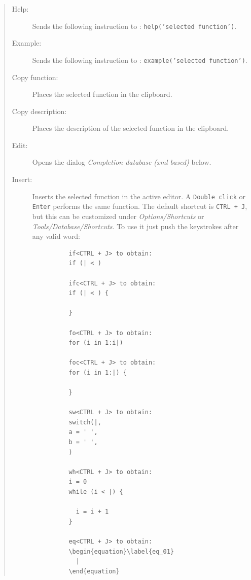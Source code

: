 \begin{quote}
  \begin{footnotesize}
    \begin{description}
      \item[Help:]
        Sends the following instruction to \RR{}: \texttt{help('selected function')}.
      \item[Example:]
        Sends the following instruction to \RR{}:
        \texttt{example('selected function')}.
      \item[Copy function:]
        Places the selected function in the clipboard.
      \item[Copy description:]
        Places the description of the selected function in the clipboard.
      \item[Edit:]
        Opens the dialog \textit{Completion database (xml based)} below.
      \item[Insert:]
        Inserts the selected function in the active editor. A \texttt{Double click}
        or \texttt{Enter} performs the same function.
        The default shortcut is \texttt{CTRL + J}, but this can be customized under
        \textit{Options/Shortcuts} or \textit{Tools/Database/Shortcuts}. To use
        it just push the keystrokes after any valid word:

        \begin{verbatim}
          if<CTRL + J> to obtain:
          if (| < )

          ifc<CTRL + J> to obtain:
          if (| < ) {

          }

          fo<CTRL + J> to obtain:
          for (i in 1:i|)

          foc<CTRL + J> to obtain:
          for (i in 1:|) {

          }

          sw<CTRL + J> to obtain:
          switch(|,
          a = ' ',
          b = ' ',
          )

          wh<CTRL + J> to obtain:
          i = 0
          while (i < |) {

            i = i + 1
          }

          eq<CTRL + J> to obtain:
          \begin{equation}\label{eq_01}
            |
          \end{equation}
        \end{verbatim}


\end{description}
\end{footnotesize}
\end{quote}

